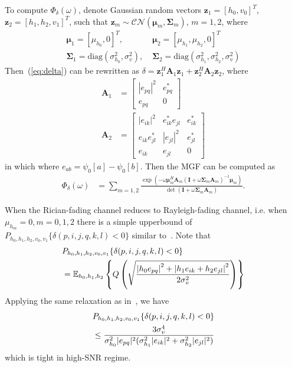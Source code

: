 \documentclass[conference]{IEEEtran}
\begin{document}
To compute $\Phi_{\delta}(\omega)$, denote Gaussian random vectors $\mathbf{z}_1
= [h_0, v_0]^T$, $\mathbf{z}_{2} = [h_1, h_2, v_1]^T$, such
that $\mathbf{z}_m\sim\mathcal{CN}(\bm{\mu}_m, \mathbf{\Sigma}_m)$, $m=1,2$,
where
\begin{align}
    \bm{\mu}_1 = [\mu_{h_0}, 0]^T,& \; \bm{\mu}_{2} = [\mu_{h_1}, \mu_{h_2},
    0]^T
    \\
    \mathbf{\Sigma}_1 = \mbox{diag}\left(\sigma_{h_0}^2, \sigma_v^2\right), & \;
    \mathbf{\Sigma}_2 = \mbox{diag}\left(\sigma_{h_1}^2, \sigma_{h_2}^2,
    \sigma_v^2\right)
\end{align}
Then~(\ref{eq:delta}) can be rewritten as $\delta = \mathbf{z}_1^H\mathbf{A}_1\mathbf{z}_1 + \mathbf{z}_{2}^H\mathbf{A}_{2}\mathbf{z}_{2}$, where
\begin{subequations}
    \begin{align}
        \mathbf{A}_1 & = \left[
            \begin{array}{cc}
                |e_{pq}|^2  & e_{pq}^* \\
                e_{pq} & 0
            \end{array}
        \right] \\
        \mathbf{A}_2 & = \left[
            \begin{array}{ccc}
            |e_{ik}|^2 & e_{ik}^*e_{jl} & e_{ik}^*
            \\
            e_{ik}e_{jl}^* & |e_{jl}|^2 & e_{jl}^*
            \\
            e_{ik} & e_{jl} & 0
        \end{array}
        \right]
    \end{align}
\end{subequations}
in which where $e_{ab} = \psi_0[a] - \psi_0[b]$. Then the MGF can be computed
as~\cite{schwartz1995communication}
\begin{align}
    \Phi_{\delta}(\omega) & = \sum_{m=1,2}
    \frac{\exp(-\omega\bm{\mu}_m^H\mathbf{A}_m(\mathbf{I} +
    \omega\mathbf{\Sigma}_m\mathbf{A}_m)^{-1}\bm{\mu}_m)}{\det(\mathbf{I} +
    \omega\mathbf{\Sigma}_m\mathbf{A}_m)}.
\end{align}


When the Rician-fading channel reduces to Rayleigh-fading channel, i.e.
when $\mu_{h_m}=0, m = 0, 1, 2$ there is a simple upperbound of
$P_{h_0,h_1,h_2,v_0,v_1}\{\delta(p,i,j,q,k,l) < 0\}$ similar
to~\cite{seddik2008trans}. Note that
\begin{align}
    & P_{h_0,h_1,h_2,v_0,v_1}\{\delta(p,i,j,q,k,l) < 0\}  \notag \\
    & = \mathbb{E}_{h_0,h_1,h_2}
    \left\{Q\left(\sqrt{\frac{\left|h_0e_{pq}\right|^2
    + \left|h_1e_{ik} + h_2e_{jl}\right|^2}
    {2\sigma_v^2}}\right)\right\}
\end{align}
Applying the same relaxation as in~\cite{seddik2008trans}, we have
\begin{align}
    & P_{h_0,h_1,h_2,v_0,v_1}\{\delta(p,i,j,q,k,l) < 0\} \notag \\
    & \leq \frac{3\sigma_v^4}{\sigma_{h_0}^2|e_{pq}|^2 (\sigma_{h_1}^2|e_{ik}|^2
    +\sigma_{h_2}^2|e_{jl}|^2)}
    \label{eq:PEP_UB}
\end{align}
which is tight in high-SNR regime.
\end{document}
